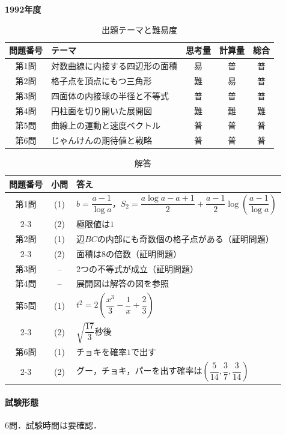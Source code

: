 \documentclass[../../main.tex]{subfiles}
\begin{document}
\begin{center}
  {\fontsize{48pt}{58pt}\selectfont \textbf{1992}\normalsize\textbf{年度}}
\end{center}

\begin{table}[htb]
  \centering
  \caption{出題テーマと難易度}
  \begin{tabular}{|c|p{6.2cm}|c|c|c|}
    \hline
    \textbf{問題番号} & \textbf{テーマ} & \textbf{思考量} & \textbf{計算量} & \textbf{総合} \\
    \hline
    第1問 & 対数曲線に内接する四辺形の面積 & 易 & 普 & 普 \\
    \hline
    第2問 & 格子点を頂点にもつ三角形 & 難 & 易 & 普 \\
    \hline
    第3問 & 四面体の内接球の半径と不等式 & 普 & 普 & 普 \\
    \hline
    第4問 & 円柱面を切り開いた展開図 & 難 & 難 & 難 \\
    \hline
    第5問 & 曲線上の運動と速度ベクトル & 普 & 普 & 普 \\
    \hline
    第6問 & じゃんけんの期待値と戦略 & 普 & 普 & 普 \\
    \hline
  \end{tabular}
\end{table}

\begin{table}[htb]
  \centering
  \caption{解答}
  \renewcommand{\arraystretch}{1.4}
  \begin{tabular}{|c|c|p{9cm}|}
    \hline
    \textbf{問題番号} & \textbf{小問} & \textbf{答え} \\
    \hline
    第1問 & (1) & $b=\dfrac{a-1}{\log a}$，$S_2=\dfrac{a\log a-a+1}{2}+\dfrac{a-1}{2}\log\left(\dfrac{a-1}{\log a}\right)$ \\
    \cline{2-3}
    & (2) & 極限値は$1$ \\
    \hline
    第2問 & (1) & 辺$BC$の内部にも奇数個の格子点がある（証明問題） \\
    \cline{2-3}
    & (2) & 面積は$8$の倍数（証明問題） \\
    \hline
    第3問 & -- & 2つの不等式が成立（証明問題） \\
    \hline
    第4問 & -- & 展開図は解答の図を参照 \\
    \hline
    第5問 & (1) & $t^2=2\left(\dfrac{x^3}{3}-\dfrac{1}{x}+\dfrac{2}{3}\right)$ \\
    \cline{2-3}
    & (2) & $\sqrt{\dfrac{17}{3}}$秒後 \\
    \hline
    第6問 & (1) & チョキを確率$1$で出す \\
    \cline{2-3}
    & (2) & グー，チョキ，パーを出す確率は$\left(\dfrac{5}{14},\dfrac{3}{7},\dfrac{3}{14}\right)$ \\
    \hline
  \end{tabular}
\end{table}

\paragraph{試験形態}
6問．試験時間は要確認．
\end{document}

